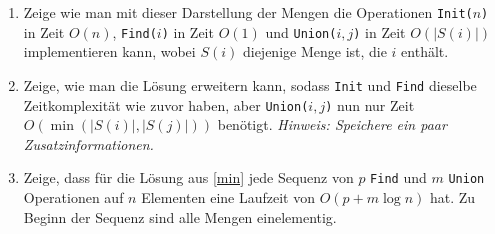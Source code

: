\documentclass{uebung_cs}
\begin{document}
\begin{aufgabe}
\begin{center}
	\end{center}
	\begin{enumerate}
		\item \mittel Zeige wie man mit dieser Darstellung der Mengen die Operationen \texttt{Init($n$)} in Zeit $O(n)$, \texttt{Find($i$)} in Zeit $O(1)$ und \texttt{Union($i,j$)} in Zeit $O(|S(i)|)$ implementieren kann, wobei $S(i)$ diejenige Menge ist, die $i$ enthält.
		\item\label{min} \mittel Zeige, wie man die Lösung erweitern kann, sodass \texttt{Init} und \texttt{Find} dieselbe Zeitkomplexität wie zuvor haben, aber \texttt{Union($i,j$)} nun nur Zeit $O(\min(|S(i)|, |S(j)|))$ benötigt.
			\textit{Hinweis: Speichere ein paar Zusatzinformationen.}
		\item \note %
    Zeige, dass für die Lösung aus \ref{min} jede Sequenz von $p$ \texttt{Find} und $m$ \texttt{Union} Operationen auf $n$ Elementen eine Laufzeit von $O(p + m\log n)$ hat.
		Zu Beginn der Sequenz sind alle Mengen einelementig.
	\end{enumerate}
\end{aufgabe}
\end{document}

